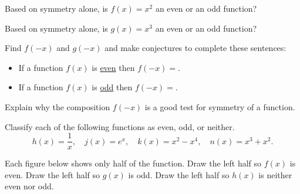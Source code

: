 \begin{activity}\label{A:0.3.3}
    \ba
        \item Based on symmetry alone, is $f(x) = x^2$ an even or an odd function?
        \item Based on symmetry alone, is $g(x) = x^3$ an even or an odd function?
        \item Find $f(-x)$ and $g(-x)$ and make conjectures to complete these sentences:
            \begin{itemize}
                \item If a function $f(x)$ is \underline{even} then $f(-x) =
                    $\underline{\hspace{1in}}.
                \item If a function $f(x)$ is \underline{odd} then $f(-x) =
                    $\underline{\hspace{1in}}.
            \end{itemize}
            Explain why the composition $f(-x)$ is a good test for symmetry of a function.
        \item Classify each of the following functions as even, odd, or neither.
            \[ h(x) = \frac{1}{x}, \quad j(x) = e^x, \quad k(x) = x^2-x^4, \quad n(x) =
            x^3+x^2. \]
        \item Each figure below shows only half of the function.  Draw the left
            half so $f(x)$ is even.  Draw the left half so $g(x)$ is odd. Draw the left
            half so $h(x)$ is neither even nor odd.
            \begin{center}

\end{center}
\end{activity}

